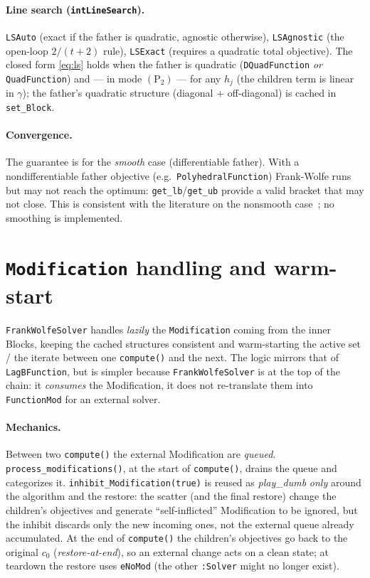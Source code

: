 \documentclass[11pt,a4paper]{article}
\newcommand{\code}[1]{\texttt{#1}}
\newcommand{\Ptwo}{(\mathrm{P}_2)}
\theoremstyle{plain}
\theoremstyle{remark}
\begin{document}
\paragraph{Line search (\code{intLineSearch}).}
\code{LSAuto} (exact if the father is quadratic, agnostic otherwise),
\code{LSAgnostic} (the open-loop $2/(t+2)$ rule), \code{LSExact} (requires a
quadratic total objective). The closed form \eqref{eq:ls} holds when the father is
quadratic (\code{DQuadFunction} \emph{or} \code{QuadFunction}) and --- in mode
$\Ptwo$ --- for any $h_j$ (the children term is linear in $\gamma$); the father's
quadratic structure (diagonal $+$ off-diagonal) is cached in \code{set\_Block}.

\paragraph{Convergence.} The guarantee is for the \emph{smooth} case
(differentiable father). With a nondifferentiable father objective (e.g.\
\code{PolyhedralFunction}) Frank-Wolfe runs but may not reach the optimum:
\code{get\_lb}/\code{get\_ub} provide a valid bracket that may not close. This is
consistent with the literature on the nonsmooth case~\cite{white93,bolte22,%
thekum20,cheungli17}; no smoothing is implemented.

\section{\code{Modification} handling and warm-start}\label{sec:mods}

\code{FrankWolfeSolver} handles \emph{lazily} the \code{Modification} coming from
the inner Blocks, keeping the cached structures consistent and warm-starting the
active set / the iterate between one \code{compute()} and the next. The logic
mirrors that of \code{LagBFunction}, but is simpler because
\code{FrankWolfeSolver} is at the top of the chain: it \emph{consumes} the
Modification, it does not re-translate them into \code{FunctionMod} for an external
solver.

\paragraph{Mechanics.}
Between two \code{compute()} the external Modification are \emph{queued}.
\code{process\_modifications()}, at the start of \code{compute()}, drains the queue
and categorizes it. \code{inhibit\_Modification(true)} is reused as
\emph{play\_dumb} \emph{only} around the algorithm and the restore: the scatter
(and the final restore) change the children's objectives and generate
``self-inflicted'' Modification to be ignored, but the inhibit discards only the
new incoming ones, not the external queue already accumulated. At the end of
\code{compute()} the children's objectives go back to the original $c_0$
(\emph{restore-at-end}), so an external change acts on a clean state; at teardown
the restore uses \code{eNoMod} (the other \code{:Solver} might no longer exist).
\end{document}
